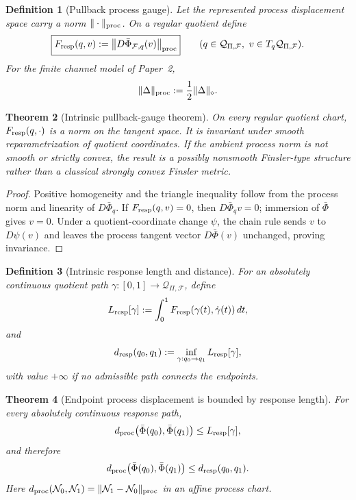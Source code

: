 \documentclass[11pt]{article}
\newtheorem{theorem}{Theorem}[section]
\newtheorem{definition}[theorem]{Definition}
\theoremstyle{remark}
\newcommand{\Qresp}{\mathcal Q}
\newcommand{\Fresp}{F_{\rm resp}}
\newcommand{\dresp}{d_{\rm resp}}
\newcommand{\dproc}{d_{\rm proc}}
\begin{document}
\begin{definition}[Pullback process gauge]
Let the represented process displacement space carry a norm $\|\cdot\|_{\rm proc}$.  On a regular quotient define
\[
        \boxed{
        \Fresp(q,v)
        :=
        \left\|D\bar\Phi_{\mathcal F,q}(v)\right\|_{\rm proc}
        }
        \qquad
        (q\in\Qresp_{\Pi,\mathcal F},\ v\in T_q\Qresp_{\Pi,\mathcal F}).
\]
For the finite channel model of Paper~2,
\[
        \|\Delta\|_{\rm proc}:=\frac12\|\Delta\|_\diamond.
\]
\end{definition}

\begin{theorem}[Intrinsic pullback-gauge theorem]
\label{thm:pullback-gauge}
On every regular quotient chart, $\Fresp(q,\cdot)$ is a norm on the tangent space.  It is invariant under smooth reparametrization of quotient coordinates.  If the ambient process norm is not smooth or strictly convex, the result is a possibly nonsmooth Finsler-type structure rather than a classical strongly convex Finsler metric.
\end{theorem}

\begin{proof}
Positive homogeneity and the triangle inequality follow from the process norm and linearity of $D\bar\Phi_q$.  If $\Fresp(q,v)=0$, then $D\bar\Phi_qv=0$; immersion of $\bar\Phi$ gives $v=0$.  Under a quotient-coordinate change $\psi$, the chain rule sends $v$ to $D\psi(v)$ and leaves the process tangent vector $D\bar\Phi(v)$ unchanged, proving invariance.
\end{proof}

\begin{definition}[Intrinsic response length and distance]
For an absolutely continuous quotient path $\gamma:[0,1]\to\Qresp_{\Pi,\mathcal F}$, define
\[
        L_{\rm resp}[\gamma]
        :=\int_0^1\Fresp(\gamma(t),\dot\gamma(t))\,dt,
\]
and
\[
        \dresp(q_0,q_1)
        :=\inf_{\gamma:q_0\to q_1}L_{\rm resp}[\gamma],
\]
with value $+\infty$ if no admissible path connects the endpoints.
\end{definition}

\begin{theorem}[Endpoint process displacement is bounded by response length]
\label{thm:endpoint-process-bound}
For every absolutely continuous response path,
\[
        \dproc\!\left(\bar\Phi(q_0),\bar\Phi(q_1)\right)
        \le L_{\rm resp}[\gamma],
\]
and therefore
\[
        \dproc\!\left(\bar\Phi(q_0),\bar\Phi(q_1)\right)
        \le \dresp(q_0,q_1).
\]
Here $\dproc(\mathcal N_0,\mathcal N_1)=\|\mathcal N_1-\mathcal N_0\|_{\rm proc}$ in an affine process chart.
\end{theorem}
\end{document}
